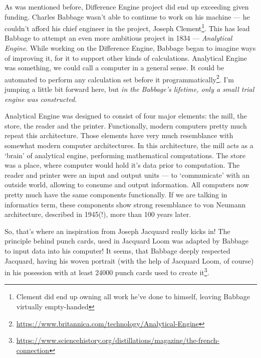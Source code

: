 \documentclass{report}
\begin{document}
            As was mentioned before, Difference Engine project did end up exceeding given funding. Charles Babbage wasn't able to continue to work on his machine --- he couldn't
            afford his chief engineer in the project, Joseph Clement\footnote{Clement did end up owning all work he've done to himself, leaving Babbage virtually empty-handed}.
            This has lead Babbage to attempt an even more ambitious project in 1834 --- \emph{Analytical Engine}. While working on the Difference Engine, Babbage began to imagine
            ways of improving it, for it to support other kinds of calculations. Analytical Engine was something, we could call a computer in a general sense. It could be
            automated to perform any calculation set before it programmatically\footnote{\href{https://www.britannica.com/technology/Analytical-Engine}
            {https://www.britannica.com/technology/Analytical-Engine}}. I'm jumping a little bit forward here, but \emph{in the Babbage's lifetime, only a small trial 
            engine was constructed.}  \par


            Analytical Engine was designed to consist of four major elements: the mill, the store, the reader and the printer. Functionally, modern computers pretty much
            repeat this architecture. Those elements have very much resemblance with somewhat modern computer architectures. In this architecture, the mill acts as a `brain'
            of analytical engine, performing mathematical computations. The store was a place, where computer would hold it's data prior to computation. The reader and printer
            were an input and output units --- to `communicate' with an outside world, allowing to consume and output information. All computers now pretty much have the same 
            components functionally. If we are talking in informatics term, these components show strong resemblance to von Neumann architecture, described in 1945(!), more than
            100 years later. \par

            So, that's where an inspiration from Joseph Jacquard really kicks in! The principle behind punch cards, used in Jacquard Loom was adapted by Babbage to input data
            into his computer! It seems, that Babbage deeply respected Jacquard, having his woven portrait (with the help of Jacquard Loom, of course) in his 
            posession with at least \num{24000} punch cards used to create it\footnote{\href{https://www.sciencehistory.org/distillations/magazine/the-french-connection}
            {https://www.sciencehistory.org/distillations/magazine/the-french-connection}}. \par
\end{document}
